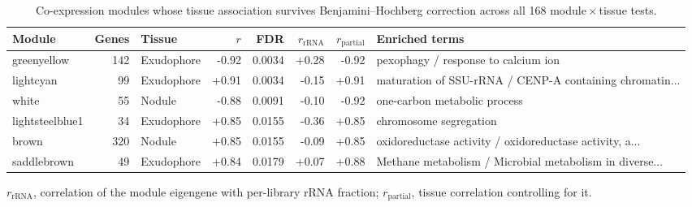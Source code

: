 \begin{table}[htbp]
\caption{Co-expression modules whose tissue association survives Benjamini--Hochberg correction across all 168 module\,$\times$\,tissue tests.}\label{tab:modules}
\footnotesize
\begin{tabular}{@{}lrlrrrrp{42mm}@{}}
\toprule
Module & Genes & Tissue & $r$ & FDR & $r_{\mathrm{rRNA}}$ & $r_{\mathrm{partial}}$ & Enriched terms \\
\midrule
greenyellow & 142 & Exudophore & -0.92 & 0.0034 & +0.28 & -0.92 & pexophagy / response to calcium ion \\
lightcyan & 99 & Exudophore & +0.91 & 0.0034 & -0.15 & +0.91 & maturation of SSU-rRNA / CENP-A containing chromatin... \\
white & 55 & Nodule & -0.88 & 0.0091 & -0.10 & -0.92 & one-carbon metabolic process \\
lightsteelblue1 & 34 & Exudophore & +0.85 & 0.0155 & -0.36 & +0.85 & chromosome segregation \\
brown & 320 & Nodule & +0.85 & 0.0155 & -0.09 & +0.85 & oxidoreductase activity / oxidoreductase activity, a... \\
saddlebrown & 49 & Exudophore & +0.84 & 0.0179 & +0.07 & +0.88 & Methane metabolism / Microbial metabolism in diverse... \\
\bottomrule
\end{tabular}
\begin{tablenotes}[flushleft]\footnotesize\item $r_{\mathrm{rRNA}}$, correlation of the module eigengene with per-library rRNA fraction; $r_{\mathrm{partial}}$, tissue correlation controlling for it.\end{tablenotes}
\end{table}
